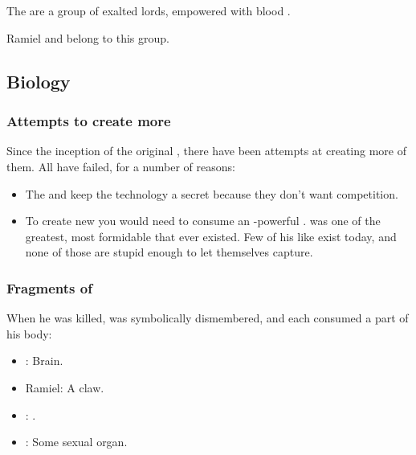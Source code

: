 \section{\Satharioth}
The \satharioth{} are a group of exalted \resphan{} lords, empowered with \draconic{} blood . 

Ramiel and \Shiaraid{} belong to this group.










\subsection{Biology}
\subsubsection{Attempts to create more \satharioth}
Since the inception of the original \satharioth, there have been attempts at creating more of them. 
All have failed, for a number of reasons:

\begin{itemize}
  \item 
    The \satharioth{} and \banelords{} keep the technology a secret because they don't want competition. 
  \item
    To create new \satharioth{} you would need to consume an \uber-powerful \vertex{}. 
    \Nexagglachel{} was one of the greatest, most formidable \dragons{} that ever existed. 
    Few of his like exist today, and none of those are stupid enough to let themselves capture. 
\end{itemize}





\subsubsection{Fragments of \Nexagglachel}
When he was killed,  was symbolically dismembered, and each \sathariah{} consumed a part of his body: 

\begin{itemize}
  \item \Azraid: Brain.
  \item Ramiel: A claw. 
  \item \Shiaraid: . 
  \item \Zachirah: Some sexual organ. 
\end{itemize}





